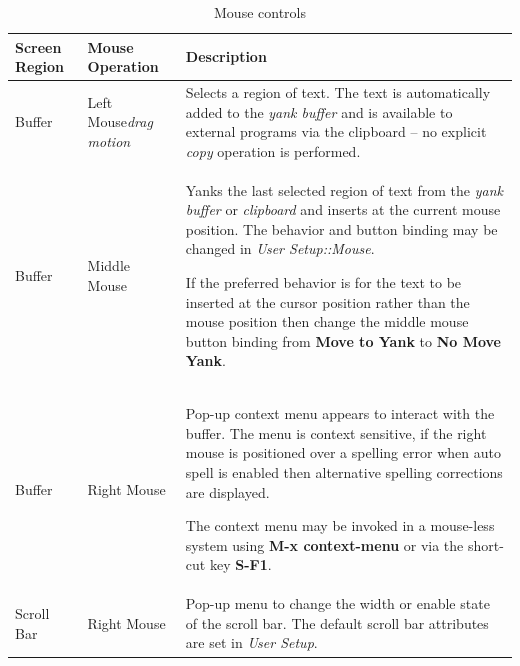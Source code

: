 \documentclass[11pt,a4paper,pdftex]{article}
\begin{document}
  \begin{center}
    \begin{small}
      \begin{longtable}{|p{}|p{}|p{}|}
          \hline
          \textbf{Screen Region} & \textbf{Mouse Operation} &
          \textbf{Description}\\
          \hline
        \endhead
          \hline
          \caption {Mouse controls (continued $\ldots$)}
        \endfoot
          \hline
          \caption {Mouse controls}
          \label{tab:mousecontrols}
        \endlastfoot

        Buffer & Left Mouse\newline \textit{drag motion} &

        Selects a region of text. The text is automatically added to the
        \textit{yank buffer} and is available to external programs via the
        clipboard -- no explicit \textit{copy} operation is performed. \\
        \hline

        Buffer & Middle Mouse &

        Yanks the last selected region of text from the \textit{yank buffer}
        or \textit{clipboard} and inserts at the current mouse position. The
        behavior and button binding may be changed in \textit{User
        Setup::\-Mouse}.

        If the preferred behavior is for the text to be inserted at the cursor
        position rather than the mouse position then change the middle mouse
        button binding from \textbf{Move to Yank} to \textbf{No Move Yank}.\\
        \hline

        Buffer & Right Mouse &

        Pop-up context menu appears to interact with the buffer. The menu is
        context sensitive, if the right mouse is positioned over a spelling
        error when auto spell is enabled then alternative spelling corrections
        are displayed.

        The context menu may be invoked in a mouse-less system using
        \textbf{M-x context-menu} or via the short-cut key \textbf{S-F1}.\\
        \hline

        Scroll Bar & Right Mouse &

        Pop-up menu to change the width or enable state of the scroll bar. The
        default scroll bar attributes are set in \textit{User Setup}.\\ \hline


\end{longtable}
\end{small}
\end{center}
\end{document}
